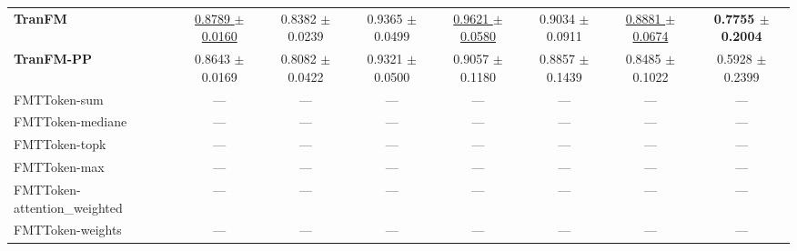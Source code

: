 \begin{table}[H]
{\begin{tabular}{lccccccc}
\textbf{TranFM} & \underline{0.8789 $\pm$ 0.0160} & 0.8382 $\pm$ 0.0239 & 0.9365 $\pm$ 0.0499 & \underline{0.9621 $\pm$ 0.0580} & 0.9034 $\pm$ 0.0911 & \underline{0.8881 $\pm$ 0.0674} & \textbf{0.7755 $\pm$ 0.2004} \\
\textbf{TranFM-PP} & 0.8643 $\pm$ 0.0169 & 0.8082 $\pm$ 0.0422 & 0.9321 $\pm$ 0.0500 & 0.9057 $\pm$ 0.1180 & 0.8857 $\pm$ 0.1439 & 0.8485 $\pm$ 0.1022 & 0.5928 $\pm$ 0.2399 \\
FMTToken-sum & — & — & — & — & — & — & — \\
FMTToken-mediane & — & — & — & — & — & — & — \\
FMTToken-topk & — & — & — & — & — & — & — \\
FMTToken-max & — & — & — & — & — & — & — \\
FMTToken-attention_weighted & — & — & — & — & — & — & — \\
FMTToken-weights & — & — & — & — & — & — & — \\
\bottomrule
\end{tabular}
}
\label{tab:reuters}
\end{table}

